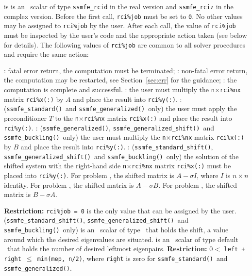 \begin{description}
%
 is is an \intentinout\ scalar  of type
{\tt ssmfe\_rcid} in the real version and
{\tt ssmfe\_rciz} in the complex version.
Before the first call, {\tt rci\%job} must be set to {\tt 0}.
No other values may be assigned to {\tt rci\%job} by the user.
After each call,
the value of {\tt rci\%job} must be inspected by the user's code
and the appropriate action taken (see below for details).
The following values of {\tt rci\%job}
are common to all solver procedures 
and require the same action: 
%
\begin{description}
%
: fatal error return, the computation must be terminated;
%
: 
non-fatal error return, the computation may be restarted,
see Section~\ref{sec:err} for the guidance;
%
: the computation is complete and successful.
%
: 
the user must multiply the {\tt n}$\times${\tt rci\%nx} matrix
   {\tt rci\%x(:)} by $A$ and place the result into {\tt rci\%y(:)}.
%
: 
({\tt ssmfe\_standard()}\ and {\tt ssmfe\_generalized()}\ only)
the user must
apply the preconditioner $T$ to the {\tt n}$\times${\tt rci\%nx} matrix
   {\tt rci\%x(:)} and place the result into {\tt rci\%y(:)}.
%
: 
({\tt ssmfe\_generalized()}, {\tt ssmfe\_generalized\_shift()}\
and {\tt ssmfe\_buckling()}\ only)
the user must multiply the {\tt n}$\times${\tt rci\%nx} matrix
   {\tt rci\%x(:)} by $B$ and place the result into {\tt rci\%y(:)}.
%
:
({\tt ssmfe\_standard\_shift()}, {\tt ssmfe\_generalized\_shift()}\
and {\tt ssmfe\_buckling()}\ only)
the solution of the shifted system
with the right-hand side {\tt n}$\times${\tt rci\%nx} matrix {\tt rci\%x(:)}
   must be placed into {\tt rci\%y(:)}.
For problem \Ref{evp}, the shifted matrix is $A - \sigma I$,
where $I$ is $n\times n$ identity.
For problem \Ref{evp.g}, the shifted matrix is $A - \sigma B$.
For problem \Ref{evp.b}, the shifted matrix is $B - \sigma A$.
%
\end{description}
%
{\bf Restriction:} 
{\tt rci\%job = 0} is the only value that can be assigned by the user.
%
\itt{sigma} 
({\tt ssmfe\_standard\_shift()}, {\tt ssmfe\_generalized\_shift()}\
and {\tt ssmfe\_buckling()}\ only)
is an \intentin\ scalar of type \REALDP\
that holds the shift, 
a value around which the desired eigenvalues %
are situated.
%
\itt{left} is an \intentin\ scalar of type default \Integer\ 
that holds the number of desired leftmost eigenpairs.
{\bf Restriction:} {$0 <$ \tt left + right $\le$ min(mep, n/2)},
where {\tt right} is zero for 
{\tt ssmfe\_standard()}\ and {\tt ssmfe\_generalized()}.

\end{description}
